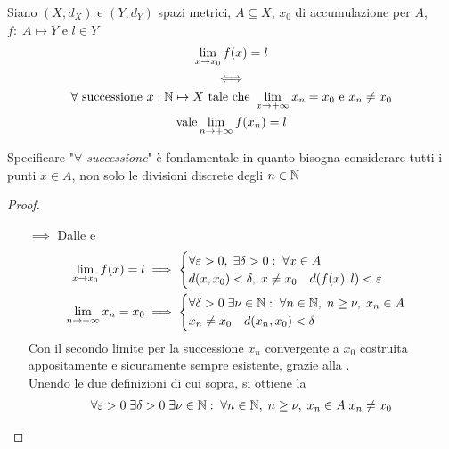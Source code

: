 \begin{proposition}
	\label{prop:funz_cont_per_succ}
	Siano $(X,d_X)$ e $(Y,d_Y)$ spazi metrici, $A \subseteq X$, $x_0$ di accumulazione per $A$, $f:\; A \mapsto Y$ e $l \in Y$
	\begin{equation*}
		\begin{gathered}
			\lim\limits_{x \to x_0} f(x) = l\\
			\iff\\
			\forall \text{ successione } x: \mathbb{N} \mapsto X \text{ tale che } \lim\limits_{x \to +\infty} x_n = x_0 \text{ e } x_n \neq x_0\\
			\text{vale} \lim\limits_{n \to +\infty} f(x_n) = l
		\end{gathered}
	\end{equation*}
	\begin{note}
		Specificare "\textit{$\forall$ successione}" è fondamentale in quanto bisogna considerare tutti i punti $x \in A$, non solo le divisioni discrete degli $n \in \mathbb{N}$
	\end{note}
	\begin{proof}~
		\begin{itemize}
			\item[$\implies$] Dalle  e 
				\begin{align*}
					\lim\limits_{x \to x_0} f(x) = l &\implies
					\begin{cases}
						\forall \varepsilon > 0,\; \exists \delta > 0:\; \forall x \in A\;\\
						d(x,x_0) < \delta,\; x \neq x_0 \quad d(f(x),l)<\varepsilon
					\end{cases}\\
					\lim\limits_{n \to +\infty} x_n = x_0 &\implies
					\begin{cases}
						\forall \delta > 0\; \exists \nu \in \mathbb{N}:\; \forall n \in \mathbb{N},\; n \geq \nu,\; x_n \in A\\
						x_n \neq x_0 \quad d(x_n, x_0) < \delta
					\end{cases}
				\end{align*}
				Con il secondo limite per la successione $x_n$ convergente a $x_0$ costruita appositamente e sicuramente sempre esistente, grazie alla .\\
				Unendo le due definizioni di cui sopra, si ottiene la
				\begin{equation*}
					\begin{gathered}
						\forall \varepsilon > 0\; \exists \delta > 0\; \exists \nu \in \N:\; \forall n \in \N,\; n \geq \nu,\; x_n \in A\; x_n \neq x_0\\

\end{gathered}
\end{equation*}
\end{itemize}
\end{proof}
\end{proposition}

